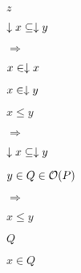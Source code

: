 \documentclass[10pt]{book}
\begin{document}
\begin{mdSnippets}
\begin{mdInlineSnippet}[fbade9e36a3f36d3d676c1b808451dd7]%
$z$\end{mdInlineSnippet}%
\begin{mdInlineSnippet}[bac0560cf68bc6e3195d08dc6ae6ab05]%
$\downarrow x \subseteq \downarrow y$\end{mdInlineSnippet}%
\begin{mdInlineSnippet}[055889aaee38b7c53f994c5e42a40994]%
$\Rightarrow$\end{mdInlineSnippet}%
\begin{mdInlineSnippet}%
$x \in \downarrow x$\end{mdInlineSnippet}%
\begin{mdInlineSnippet}[21c4556c0565ea69cf6a4e2227ea600f]%
$x \in \downarrow y$\end{mdInlineSnippet}%
\begin{mdInlineSnippet}[a06b941ca6029ffd3ef8c0653b7e280e]%
$x \leq y$\end{mdInlineSnippet}%
\begin{mdInlineSnippet}[055889aaee38b7c53f994c5e42a40994]%
$\Rightarrow$\end{mdInlineSnippet}%
\begin{mdInlineSnippet}[bac0560cf68bc6e3195d08dc6ae6ab05]%
$\downarrow x \subseteq \downarrow y$\end{mdInlineSnippet}%
\begin{mdInlineSnippet}[a71e537b6bde84e39834f574e233a483]%
$y \in Q \in \mathcal{O}(P)$\end{mdInlineSnippet}%
\begin{mdInlineSnippet}[055889aaee38b7c53f994c5e42a40994]%
$\Rightarrow$\end{mdInlineSnippet}%
\begin{mdInlineSnippet}[a06b941ca6029ffd3ef8c0653b7e280e]%
$x \leq y$\end{mdInlineSnippet}%
\begin{mdInlineSnippet}[f09564c9ca56850d4cd6b3319e541aee]%
$Q$\end{mdInlineSnippet}%
\begin{mdInlineSnippet}%
$x \in Q$\end{mdInlineSnippet}%

\end{mdSnippets}
\end{document}
